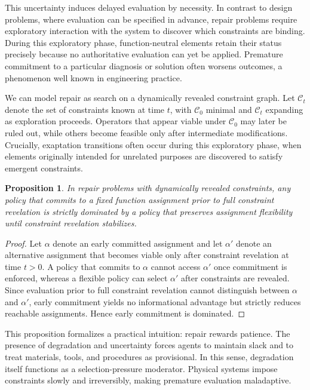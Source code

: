 \documentclass[11pt]{article}
\newtheorem{proposition}{Proposition}
\theoremstyle{definition}
\begin{document}
This uncertainty induces delayed evaluation by necessity. In contrast to design problems, where evaluation can be specified in advance, repair problems require exploratory interaction with the system to discover which constraints are binding. During this exploratory phase, function-neutral elements retain their status precisely because no authoritative evaluation can yet be applied. Premature commitment to a particular diagnosis or solution often worsens outcomes, a phenomenon well known in engineering practice.

We can model repair as search on a dynamically revealed constraint graph. Let $\mathcal{C}_t$ denote the set of constraints known at time $t$, with $\mathcal{C}_0$ minimal and $\mathcal{C}_t$ expanding as exploration proceeds. Operators that appear viable under $\mathcal{C}_0$ may later be ruled out, while others become feasible only after intermediate modifications. Crucially, exaptation transitions often occur during this exploratory phase, when elements originally intended for unrelated purposes are discovered to satisfy emergent constraints.

\begin{proposition}
In repair problems with dynamically revealed constraints, any policy that commits to a fixed function assignment prior to full constraint revelation is strictly dominated by a policy that preserves assignment flexibility until constraint revelation stabilizes.
\end{proposition}

\begin{proof}
Let $\alpha$ denote an early committed assignment and let $\alpha'$ denote an alternative assignment that becomes viable only after constraint revelation at time $t>0$. A policy that commits to $\alpha$ cannot access $\alpha'$ once commitment is enforced, whereas a flexible policy can select $\alpha'$ after constraints are revealed. Since evaluation prior to full constraint revelation cannot distinguish between $\alpha$ and $\alpha'$, early commitment yields no informational advantage but strictly reduces reachable assignments. Hence early commitment is dominated.
\end{proof}

This proposition formalizes a practical intuition: repair rewards patience. The presence of degradation and uncertainty forces agents to maintain slack and to treat materials, tools, and procedures as provisional. In this sense, degradation itself functions as a selection-pressure moderator. Physical systems impose constraints slowly and irreversibly, making premature evaluation maladaptive.
\end{document}
